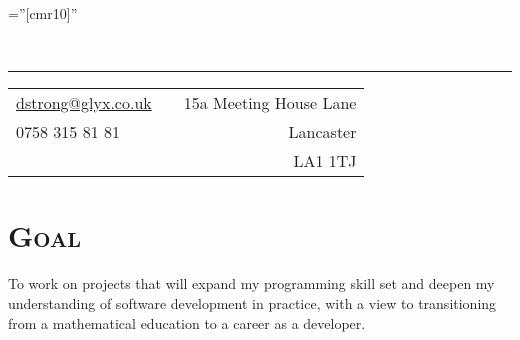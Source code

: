 \documentclass[a4paper,10pt]{article} %
\begin{document}
\pagestyle{empty} %

\font\fb=''[cmr10]'' %


\\ %
\hrule
\footnotesize{
\begin{tabularx}{\textwidth}{lXr}
\href{mailto:dstrong@glyx.co.uk}{dstrong@glyx.co.uk}    & & {15a Meeting House Lane}\\
{0758 315 81 81}                                        & & {Lancaster}\\ 
                                                        & & {LA1 1TJ}
\end{tabularx}
}


\section{\textsc{Goal}}

\begin{flushleft}
To work on projects that will expand my programming skill set and deepen my understanding of software development in practice, with a view to transitioning from a mathematical education to a career as a developer.
\end{flushleft}

\end{document}
